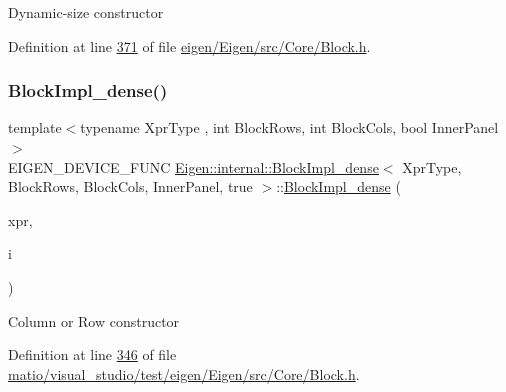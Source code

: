 Dynamic-\/size constructor 

Definition at line \hyperlink{eigen_2_eigen_2src_2_core_2_block_8h_source_l00371}{371} of file \hyperlink{eigen_2_eigen_2src_2_core_2_block_8h_source}{eigen/\+Eigen/src/\+Core/\+Block.\+h}.

\mbox{\label{class_eigen_1_1internal_1_1_block_impl__dense_3_01_xpr_type_00_01_block_rows_00_01_block_cols_00_01_inner_panel_00_01true_01_4_a72b340bbcd3acefc375e7a5eacd790f5}} 
\subsubsection{\texorpdfstring{Block\+Impl\+\_\+dense()}{BlockImpl\_dense()}\hspace{0.1cm}{\footnotesize\ttfamily [4/6]}}
{\footnotesize\ttfamily template$<$typename Xpr\+Type , int Block\+Rows, int Block\+Cols, bool Inner\+Panel$>$ \\
E\+I\+G\+E\+N\+\_\+\+D\+E\+V\+I\+C\+E\+\_\+\+F\+U\+NC \hyperlink{class_eigen_1_1internal_1_1_block_impl__dense}{Eigen\+::internal\+::\+Block\+Impl\+\_\+dense}$<$ Xpr\+Type, Block\+Rows, Block\+Cols, Inner\+Panel, true $>$\+::\hyperlink{class_eigen_1_1internal_1_1_block_impl__dense}{Block\+Impl\+\_\+dense} (\begin{DoxyParamCaption}\item[{Xpr\+Type \&}]{xpr,  }\item[{\hyperlink{namespace_eigen_a62e77e0933482dafde8fe197d9a2cfde}{Index}}]{i }\end{DoxyParamCaption})\hspace{0.3cm}{\ttfamily [inline]}}

Column or Row constructor 

Definition at line \hyperlink{matio_2visual__studio_2test_2eigen_2_eigen_2src_2_core_2_block_8h_source_l00346}{346} of file \hyperlink{matio_2visual__studio_2test_2eigen_2_eigen_2src_2_core_2_block_8h_source}{matio/visual\+\_\+studio/test/eigen/\+Eigen/src/\+Core/\+Block.\+h}.


